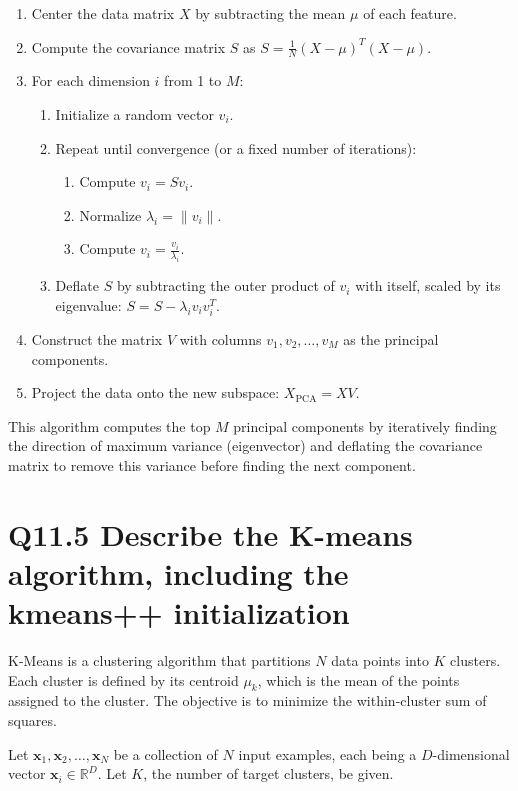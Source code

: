 \documentclass[11pt]{article}
\begin{document}
\begin{enumerate}
    \item Center the data matrix \( X \) by subtracting the mean \( \mu \) of each feature.
    \item Compute the covariance matrix \( S \) as \( S = \frac{1}{N} (X - \mu)^T(X - \mu) \).
    \item For each dimension \( i \) from 1 to \( M \):
    \begin{enumerate}
        \item Initialize a random vector \( v_i \).
        \item Repeat until convergence (or a fixed number of iterations):
        \begin{enumerate}
            \item Compute \( v_i = Sv_i \).
            \item Normalize \( \lambda_i = \|v_i\| \).
            \item Compute \( v_i = \frac{v_i}{\lambda_i} \).
        \end{enumerate}
        \item Deflate \( S \) by subtracting the outer product of \( v_i \) with itself, scaled by its eigenvalue: \( S = S - \lambda_i v_i v_i^T \).
    \end{enumerate}
    \item Construct the matrix \( V \) with columns \( v_1, v_2, \ldots, v_M \) as the principal components.
    \item Project the data onto the new subspace: \( X_{\text{PCA}} = XV \).
\end{enumerate}

This algorithm computes the top \( M \) principal components by iteratively finding the direction of maximum variance (eigenvector) and deflating the covariance matrix to remove this variance before finding the next component.

\section{Q11.5 Describe the K-means algorithm, including the kmeans++ initialization}

K-Means is a clustering algorithm that partitions \( N \) data points into \( K \) clusters. Each cluster is defined by its centroid \( \mu_k \), which is the mean of the points assigned to the cluster. The objective is to minimize the within-cluster sum of squares.

Let \( \mathbf{x}_1, \mathbf{x}_2, \ldots, \mathbf{x}_N \) be a collection of \( N \) input examples, each being a \( D \)-dimensional vector \( \mathbf{x}_i \in \mathbb{R}^D \). Let \( K \), the number of target clusters, be given.
\end{document}
